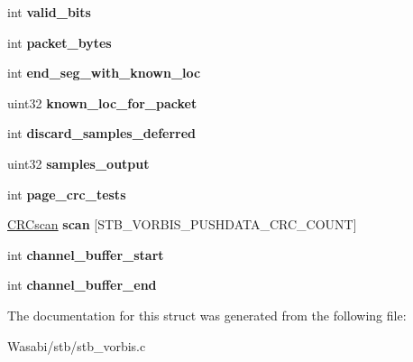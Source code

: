 \begin{DoxyCompactItemize}
\item 
int {\bfseries valid\+\_\+bits}\hypertarget{structstb__vorbis_a4aa9d73a234428a6194cd37b8c0be4e0}{}\label{structstb__vorbis_a4aa9d73a234428a6194cd37b8c0be4e0}

\item 
int {\bfseries packet\+\_\+bytes}\hypertarget{structstb__vorbis_a3328726a6d040dbc75a5d2e0f34232c3}{}\label{structstb__vorbis_a3328726a6d040dbc75a5d2e0f34232c3}

\item 
int {\bfseries end\+\_\+seg\+\_\+with\+\_\+known\+\_\+loc}\hypertarget{structstb__vorbis_abf4405ff473eed0c4a8bf23cb064f1aa}{}\label{structstb__vorbis_abf4405ff473eed0c4a8bf23cb064f1aa}

\item 
uint32 {\bfseries known\+\_\+loc\+\_\+for\+\_\+packet}\hypertarget{structstb__vorbis_ab4f2b28e26cb9f9a060a7b7855f12ece}{}\label{structstb__vorbis_ab4f2b28e26cb9f9a060a7b7855f12ece}

\item 
int {\bfseries discard\+\_\+samples\+\_\+deferred}\hypertarget{structstb__vorbis_adbacf2120eaa0099f886770c51d633d2}{}\label{structstb__vorbis_adbacf2120eaa0099f886770c51d633d2}

\item 
uint32 {\bfseries samples\+\_\+output}\hypertarget{structstb__vorbis_a6b955aa04bfd9f4a59bca3d8d027b592}{}\label{structstb__vorbis_a6b955aa04bfd9f4a59bca3d8d027b592}

\item 
int {\bfseries page\+\_\+crc\+\_\+tests}\hypertarget{structstb__vorbis_a4d3ba492214db27970d9292a3d60b421}{}\label{structstb__vorbis_a4d3ba492214db27970d9292a3d60b421}

\item 
\hyperlink{struct_c_r_cscan}{C\+R\+Cscan} {\bfseries scan} \mbox{[}S\+T\+B\+\_\+\+V\+O\+R\+B\+I\+S\+\_\+\+P\+U\+S\+H\+D\+A\+T\+A\+\_\+\+C\+R\+C\+\_\+\+C\+O\+U\+NT\mbox{]}\hypertarget{structstb__vorbis_ac2972ae486c5a1bc59e1f0ebb3fa0739}{}\label{structstb__vorbis_ac2972ae486c5a1bc59e1f0ebb3fa0739}

\item 
int {\bfseries channel\+\_\+buffer\+\_\+start}\hypertarget{structstb__vorbis_af0bf960e2d513d207ee6a9f38eefe770}{}\label{structstb__vorbis_af0bf960e2d513d207ee6a9f38eefe770}

\item 
int {\bfseries channel\+\_\+buffer\+\_\+end}\hypertarget{structstb__vorbis_ab0c6866c39ae3cd00d5ede2dd5ff512c}{}\label{structstb__vorbis_ab0c6866c39ae3cd00d5ede2dd5ff512c}

\end{DoxyCompactItemize}


The documentation for this struct was generated from the following file\+:\begin{DoxyCompactItemize}
\item 
Wasabi/stb/stb\+\_\+vorbis.\+c\end{DoxyCompactItemize}
